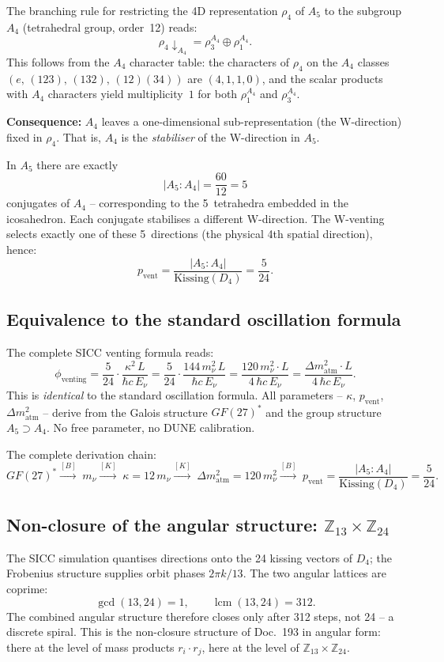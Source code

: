 The branching rule for restricting the 4D representation $\rho_4$ of
$A_5$ to the subgroup $A_4$ (tetrahedral group, order~12) reads:
\[
\boxed{\rho_4\!\downarrow_{A_4}=\rho_3^{A_4}\oplus\rho_1^{A_4}.}
\]
This follows from the $A_4$ character table: the characters of $\rho_4$
on the $A_4$ classes $(e,\,(123),\,(132),\,(12)(34))$ are $(4,1,1,0)$,
and the scalar products with $A_4$ characters yield multiplicity~$1$ for
both $\rho_1^{A_4}$ and $\rho_3^{A_4}$.

\medskip
\textbf{Consequence:} $A_4$ leaves a one-dimensional sub-representation
(the W-direction) fixed in $\rho_4$. That is, $A_4$ is the
\emph{stabiliser} of the W-direction in $A_5$.

In $A_5$ there are exactly
\[
|A_5:A_4|=\frac{60}{12}=5
\]
conjugates of $A_4$ -- corresponding to the 5~tetrahedra embedded in
the icosahedron. Each conjugate stabilises a different W-direction.
The W-venting selects exactly one of these 5~directions (the physical
4th spatial direction), hence:
\[
\boxed{p_\text{vent}=\frac{|A_5:A_4|}{\text{Kissing}(D_4)}
=\frac{5}{24}.}
\]

\subsection{Equivalence to the standard oscillation formula}

The complete SICC venting formula reads:
\[
\phi_\text{venting}
=\frac{5}{24}\cdot\frac{\kappa^2\,L}{\hbar c\,E_\nu}
=\frac{5}{24}\cdot\frac{144\,m_\nu^2\,L}{\hbar c\,E_\nu}
=\frac{120\,m_\nu^2\cdot L}{4\,\hbar c\,E_\nu}
=\frac{\Delta m^2_\text{atm}\cdot L}{4\,\hbar c\,E_\nu}.
\]
This is \emph{identical} to the standard oscillation formula.
All parameters -- $\kappa$, $p_\text{vent}$, $\Delta m^2_\text{atm}$ --
derive from the Galois structure $GF(27)^*$ and the group structure
$A_5\supset A_4$. No free parameter, no DUNE calibration.

The complete derivation chain:
\[
GF(27)^*
\xrightarrow{[B]}\;m_\nu
\xrightarrow{[K]}\;\kappa=12\,m_\nu
\xrightarrow{[K]}\;\Delta m^2_\text{atm}=120\,m_\nu^2
\xrightarrow{[B]}\;p_\text{vent}=\frac{|A_5:A_4|}{\text{Kissing}(D_4)}
=\frac{5}{24}.
\]

\subsection{Non-closure of the angular structure: $\mathbb{Z}_{13}\times\mathbb{Z}_{24}$ \BM}

The SICC simulation quantises directions onto the 24 kissing
vectors of $D_4$; the Frobenius structure supplies orbit phases
$2\pi k/13$. The two angular lattices are coprime:
\[
\gcd(13,24)=1,\qquad \operatorname{lcm}(13,24)=312.
\]
The combined angular structure therefore closes only after 312
steps, not 24 -- a discrete spiral. This is the non-closure
structure of Doc.~193 in angular form: there at the level of mass
products $r_i\cdot r_j$, here at the level of
$\mathbb{Z}_{13}\times\mathbb{Z}_{24}$.


